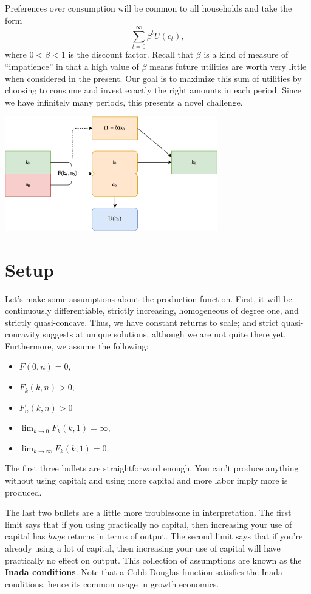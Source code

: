 \documentclass[12pt]{article}
\theoremstyle{definition}
\begin{document}
Preferences over consumption will be common to all households and take the form
	\[	\sum_{t=0}^{\infty} \beta^t U(c_t),\]
where $0 < \beta < 1$ is the discount factor. Recall that $\beta$ is a kind of measure of ``impatience'' in that a high value of $\beta$ means future utilities are worth very little when considered in the present. Our goal is to maximize this sum of utilities by choosing to consume and invest exactly the right amounts in each period. Since we have infinitely many periods, this presents a novel challenge. 
		\begin{center}
			\includegraphics[width=350px]{01-growth1.png}
		\end{center} 



\section{Setup}

Let's make some assumptions about the production function. First, it will be continuously differentiable, strictly increasing, homogeneous of degree one, and strictly quasi-concave. Thus, we have constant returns to scale; and strict quasi-concavity suggests at unique solutions, although we are not quite there yet. Furthermore, we assume the following:
\begin{itemize}
	\itemsep0em
	\item $F(0,n)=0$,
	\item $F_k(k,n)>0$,
	\item $F_n(k,n) >0$
	\item $\lim_{k \rightarrow 0} F_k(k,1) = \infty$,
	\item $\lim_{k \rightarrow \infty} F_k(k,1) = 0$.
\end{itemize}
The first three bullets are straightforward enough. You can't produce anything without using capital; and using more capital and more labor imply more is produced.

The last two bullets are a little more troublesome in interpretation. The first limit says that if you using practically no capital, then increasing your use of capital has \emph{huge} returns in terms of output. The second limit says that if you're already using a lot of capital, then increasing your use of capital will have practically no effect on output. This collection of assumptions are known as the \textbf{Inada conditions}. Note that a Cobb-Douglas function satisfies the Inada conditions, hence its common usage in growth economics.
\end{document}
